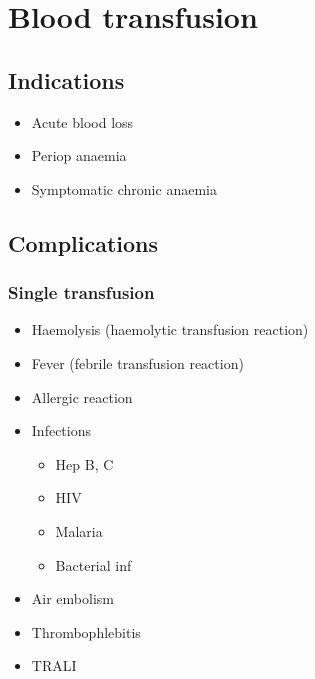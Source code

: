 \documentclass[
  12pt,
]{memoir}
\providecommand{\tightlist}{%
  \setlength{\itemsep}{0pt}\setlength{\parskip}{0pt}}
\begin{document}
\pagebreak

\hypertarget{blood-transfusion}{%
\chapter{Blood transfusion}\label{blood-transfusion}}

\hypertarget{indications}{%
\section{Indications}\label{indications}}

\begin{itemize}
\tightlist
\item
  Acute blood loss
\item
  Periop anaemia
\item
  Symptomatic chronic anaemia
\end{itemize}

\hypertarget{complications}{%
\section{Complications}\label{complications}}

\hypertarget{single-transfusion}{%
\subsection{Single transfusion}\label{single-transfusion}}

\begin{itemize}
\tightlist
\item
  Haemolysis (haemolytic transfusion reaction)
\item
  Fever (febrile transfusion reaction)
\item
  Allergic reaction
\item
  Infections

  \begin{itemize}
  \tightlist
  \item
    Hep B, C
  \item
    HIV
  \item
    Malaria
  \item
    Bacterial inf
  \end{itemize}
\item
  Air embolism
\item
  Thrombophlebitis
\item
  TRALI
\end{itemize}
\end{document}
